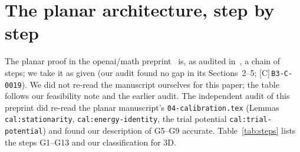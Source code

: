 \documentclass[10pt]{article}
\newcommand{\tier}[1]{\textsf{[#1]}}
\newcommand{\cid}[1]{\texttt{B3-#1}}
\theoremstyle{remark}
\begin{document}
\section{The planar architecture, step by step}\label{sec:arch}
The planar proof in the openai/math preprint~\cite{oai} is, as audited in~\cite{audit}, a chain of steps; we take it as given
(our audit found no gap in its Sections~2--5; \tier{C}\,\cid{C-0019}). We did not re-read the manuscript ourselves for this paper; the table follows our feasibility
note and the earlier audit. The independent audit of this preprint did re-read the planar manuscript's \texttt{04-calibration.tex} (Lemmas \texttt{cal:stationarity}, \texttt{cal:energy-identity}, the trial potential \texttt{cal:trial-potential}) and found our description of G5--G9 accurate. Table~\ref{tab:steps} lists the steps G1--G13 and our classification for 3D.
\end{document}
